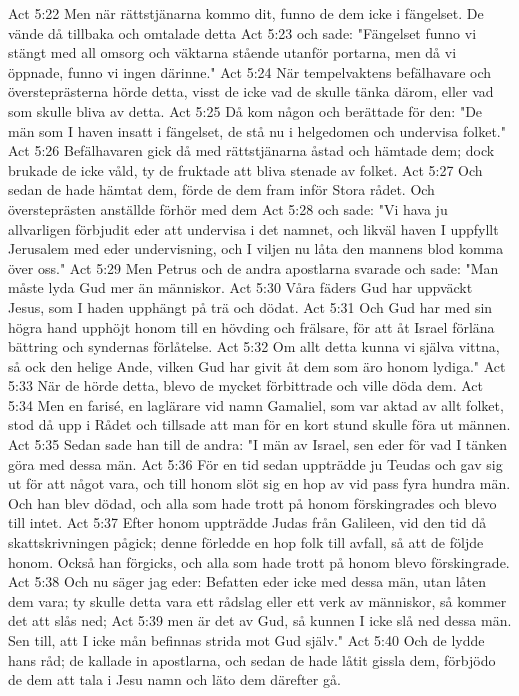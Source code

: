 Act 5:22  Men när rättstjänarna kommo dit, funno de dem icke i fängelset. De vände då tillbaka och omtalade detta
Act 5:23  och sade: "Fängelset funno vi stängt med all omsorg och väktarna stående utanför portarna, men då vi öppnade, funno vi ingen därinne."
Act 5:24  När tempelvaktens befälhavare och översteprästerna hörde detta, visst de icke vad de skulle tänka därom, eller vad som skulle bliva av detta.
Act 5:25  Då kom någon och berättade för den: "De män som I haven insatt i fängelset, de stå nu i helgedomen och undervisa folket."
Act 5:26  Befälhavaren gick då med rättstjänarna åstad och hämtade dem; dock brukade de icke våld, ty de fruktade att bliva stenade av folket.
Act 5:27  Och sedan de hade hämtat dem, förde de dem fram inför Stora rådet. Och översteprästen anställde förhör med dem
Act 5:28  och sade: "Vi hava ju allvarligen förbjudit eder att undervisa i det namnet, och likväl haven I uppfyllt Jerusalem med eder undervisning, och I viljen nu låta den mannens blod komma över oss."
Act 5:29  Men Petrus och de andra apostlarna svarade och sade: "Man måste lyda Gud mer än människor.
Act 5:30  Våra fäders Gud har uppväckt Jesus, som I haden upphängt på trä och dödat.
Act 5:31  Och Gud har med sin högra hand upphöjt honom till en hövding och frälsare, för att åt Israel förläna bättring och syndernas förlåtelse.
Act 5:32  Om allt detta kunna vi själva vittna, så ock den helige Ande, vilken Gud har givit åt dem som äro honom lydiga."
Act 5:33  När de hörde detta, blevo de mycket förbittrade och ville döda dem.
Act 5:34  Men en farisé, en laglärare vid namn Gamaliel, som var aktad av allt folket, stod då upp i Rådet och tillsade att man för en kort stund skulle föra ut männen.
Act 5:35  Sedan sade han till de andra: "I män av Israel, sen eder för vad I tänken göra med dessa män.
Act 5:36  För en tid sedan uppträdde ju Teudas och gav sig ut för att något vara, och till honom slöt sig en hop av vid pass fyra hundra män. Och han blev dödad, och alla som hade trott på honom förskingrades och blevo till intet.
Act 5:37  Efter honom uppträdde Judas från Galileen, vid den tid då skattskrivningen pågick; denne förledde en hop folk till avfall, så att de följde honom. Också han förgicks, och alla som hade trott på honom blevo förskingrade.
Act 5:38  Och nu säger jag eder: Befatten eder icke med dessa män, utan låten dem vara; ty skulle detta vara ett rådslag eller ett verk av människor, så kommer det att slås ned;
Act 5:39  men är det av Gud, så kunnen I icke slå ned dessa män. Sen till, att I icke mån befinnas strida mot Gud själv."
Act 5:40  Och de lydde hans råd; de kallade in apostlarna, och sedan de hade låtit gissla dem, förbjödo de dem att tala i Jesu namn och läto dem därefter gå.
